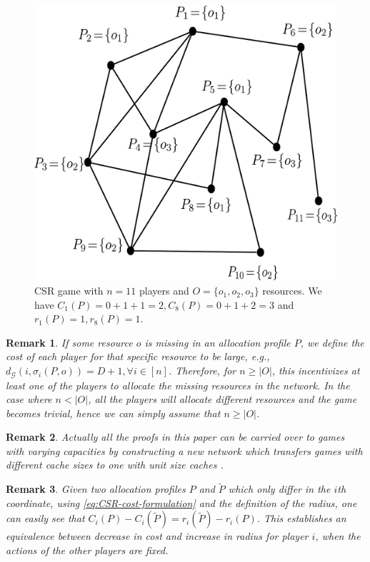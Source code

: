 \documentclass[conference, 10pt, twocolumn]{ieeeconf}
\newtheorem{remark}{Remark}
\begin{document}
\begin{figure}[htb]
\vspace{-1.5cm}
\begin{center}
\includegraphics[totalheight=.22\textheight,
width=.4\textwidth,viewport=-50 0 800 750]{example} \hspace{0.4in}
\end{center}
\vspace{-0.3cm}\caption{CSR game with $n=11$ players and $O=\{o_1,o_2,o_3\}$ resources. We have $C_1(P)=0+1+1=2, C_8(P)=0+1+2=3$ and $r_1(P)=1, r_8(P)=1$.}
\label{fig:example-model}
\end{figure}
\vspace{-0.3cm}
\begin{remark}
If some resource $o$ is missing in an allocation profile $P$, we define the cost of each player for that specific resource to be large, e.g., $d_{\mathcal{G}}(i, \sigma_i(P, o)) = D + 1, \forall i \in [n]$. Therefore, for $n \ge |O|$, this incentivizes at least one of the players to allocate the missing resources in the network. In the case where $n < |O|$, all the players will allocate different resources and the game becomes trivial, hence we can simply assume that $n \ge |O|$. 
\end{remark}

\begin{remark}\label{rem:varying-cache}
Actually all the proofs in this paper can be carried over to games with varying capacities by constructing a new network which transfers games with different cache sizes to one with unit size caches \cite{etesami2014pure,gopalakrishnan2012cache}.
\end{remark}

\begin{remark}\label{rem:cost-to-radius}
Given two allocation profiles $P$ and $\tilde{P}$ which only differ in the $i$th coordinate, using \eqref{eq:CSR-cost-formulation} and the definition of the radius, one can easily see that $C_i(P)-C_i(\tilde{P})=r_i(\tilde{P})-r_i(P)$. This establishes an equivalence between decrease in cost and increase in radius for player $i$, when the actions of the other players are fixed. 
\end{remark}
\end{document}
